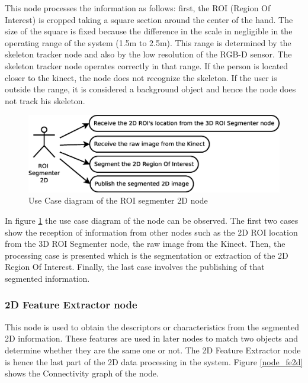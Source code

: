 	This node processes the information as follows: first, the ROI (Region Of Interest) is cropped taking a square section around the center of the hand. 
	The size of the square is fixed because the difference in the scale in negligible in the operating range of the system (1.5m to 2.5m). 
	This range is determined by the skeleton tracker node and also by the low resolution of the RGB-D sensor. 
	The skeleton tracker node operates correctly in that range. 
	If the person is located closer to the kinect, the node does not recognize the skeleton. 
	If the user is outside the range, it is considered a background object and hence the node does not track his skeleton. 
	\\
	\begin{figure}[H]
		\centering
			\includegraphics[scale=0.4]{img/diagrams/uc_roi_segmenter_2d.eps}
			\caption[Use case diagram ROI segmenter 2D node]{Use Case diagram of the ROI segmenter 2D node}
		\label{uc_roi2d}
	\end{figure}

	In figure \ref{uc_roi2d} the use case diagram of the node can be observed.
	The first two cases show the reception of information from other nodes such as the 2D ROI location from the 3D ROI Segmenter node, the raw image from the Kinect. 
	Then, the processing case is presented which is the segmentation or extraction of the 2D Region Of Interest. 
	Finally, the last case involves the publishing of that segmented information. 

\subsubsection{2D Feature Extractor node}
\label{fe2d}
	This node is used to obtain the descriptors or characteristics from the segmented 2D information. 
	These features are used in later nodes to match two objects and determine whether they are the same one or not. 
	The 2D Feature Extractor node is hence the last part of the 2D data processing in the system. 
	Figure \ref{node_fe2d} shows the Connectivity graph of the node. 

